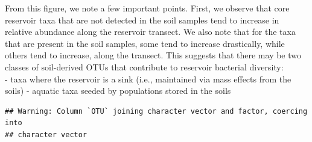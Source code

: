 \documentclass[]{article}
\newenvironment{Shaded}{\begin{snugshade}}{\end{snugshade}}
\newcommand{\KeywordTok}[1]{\textcolor[rgb]{0.13,0.29,0.53}{\textbf{#1}}}
\newcommand{\DataTypeTok}[1]{\textcolor[rgb]{0.13,0.29,0.53}{#1}}
\newcommand{\DecValTok}[1]{\textcolor[rgb]{0.00,0.00,0.81}{#1}}
\newcommand{\FloatTok}[1]{\textcolor[rgb]{0.00,0.00,0.81}{#1}}
\newcommand{\StringTok}[1]{\textcolor[rgb]{0.31,0.60,0.02}{#1}}
\newcommand{\CommentTok}[1]{\textcolor[rgb]{0.56,0.35,0.01}{\textit{#1}}}
\newcommand{\ControlFlowTok}[1]{\textcolor[rgb]{0.13,0.29,0.53}{\textbf{#1}}}
\newcommand{\OperatorTok}[1]{\textcolor[rgb]{0.81,0.36,0.00}{\textbf{#1}}}
\newcommand{\NormalTok}[1]{#1}
\begin{document}
From this figure, we note a few important points. First, we observe that
core reservoir taxa that are not detected in the soil samples tend to
increase in relative abundance along the reservoir transect. We also
note that for the taxa that are present in the soil samples, some tend
to increase drastically, while others tend to increase, along the
transect. This suggests that there may be two classes of soil-derived
OTUs that contribute to reservoir bacterial diversity:\\
- taxa where the reservoir is a sink (i.e., maintained via mass effects
from the soils) - aquatic taxa seeded by populations stored in the soils

\begin{Shaded}
\end{Shaded}

\begin{verbatim}
## Warning: Column `OTU` joining character vector and factor, coercing into
## character vector
\end{verbatim}
\end{document}
